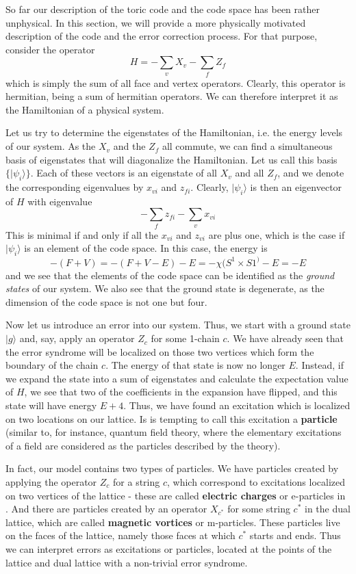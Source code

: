 \documentclass[a4paper, draft]{article}
\theoremstyle{own}
\theoremstyle{remark}
\begin{document}
So far our description of the toric code and the code space has been rather unphysical. In this section, we will provide a more physically motivated description of the code and the error correction process. For that purpose, consider the operator
$$
H = - \sum_v X_v - \sum_f Z_f
$$
which is simply the sum of all face and vertex operators. Clearly, this operator is hermitian, being a sum of hermitian operators. We can therefore interpret it as the Hamiltonian of a physical system.

Let us try to determine the eigenstates of the Hamiltonian, i.e. the energy levels of our system. As the $X_v$ and the $Z_f$ all commute, we can find a simultaneous basis of eigenstates that will diagonalize the Hamiltonian. Let us call this basis $\{ |\psi_i \rangle \}$. Each of these vectors is an eigenstate of all $X_v$ and all $Z_f$, and we denote the corresponding eigenvalues by $x_{vi}$ and $z_{fi}$. Clearly, $|\psi_i \rangle$ is then an eigenvector of $H$ with eigenvalue
$$
- \sum_f z_{fi} - \sum_v x_{vi}
$$
This is minimal if and only if all the $x_{vi}$ and $z_{vi}$ are plus one, which is the case if $|\psi_i \rangle$ is an element of the code space. In this case, the energy is
$$
- (F + V) = - (F + V - E) - E = - \chi(S^1 \times S1^) - E = - E
$$
and we see that the elements of the code space can be identified as the \emph{ground states} of our system. We also see that the ground state is degenerate, as the dimension of the code space is not one but four.

Now let us introduce an error into our system. Thus, we start with a ground state $|g \rangle$ and, say, apply an operator $Z_c$ for some 1-chain $c$. We have already seen that the error syndrome will be localized on those two vertices which form the boundary of the chain $c$. The energy of that state is now no longer $E$. Instead, if we expand the state into a sum of eigenstates and calculate the expectation value of $H$, we see that two of the coefficients in the expansion have flipped, and this state will have energy $E + 4$. Thus, we have found an excitation which is localized on two locations on our lattice. Is is tempting to call this excitation a {\bf particle} (similar to, for instance, quantum field theory, where the elementary excitations of a field are considered as the particles described by the theory).

In fact, our model contains two types of particles. We have particles created by applying the operator $Z_c$ for a string $c$, which correspond to excitations localized on two vertices of the lattice - these are called {\bf electric charges} or e-particles in \cite{Kitaev}. And there are particles created by an operator $X_{c^*}$ for some string $c^*$ in the dual lattice, which are called {\bf magnetic vortices} or m-particles. These particles live on the faces of the lattice, namely those faces at which $c^*$ starts and ends. Thus we can interpret errors as excitations or particles, located at the points of the lattice and dual lattice with a non-trivial error syndrome. 
\end{document}
